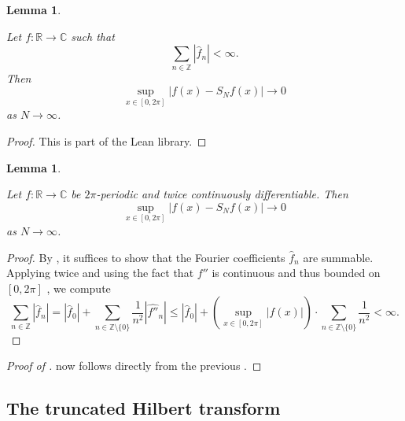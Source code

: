 \documentclass[10pt,a4paper]{article}
\theoremstyle{plain}
\newtheorem{lemma}[theorem]{Lemma}
\theoremstyle{definition}
\numberwithin{equation}{subsection}
\newcommand{\Z}{{\mathbb{Z}}}
\newcommand{\R}{{\mathbb{R}}}
\newcommand{\lean}[1]{}
\newcommand{\proves}[1]{}
\newcommand{\uses}[1]{}
\newcommand{\leanok}{}
\def\C{\mathbb{C}}
\begin{document}
\begin{lemma}
\label{convergence-of-coeffs-summable}
\leanok
\lean{hasSum_fourier_series_of_summable}
Let $f:\R \to \C$ such that
\begin{equation}
    \sum_{n\in \Z} |\widehat{f}_n| < \infty.
\end{equation}
Then
\begin{equation}
    \sup_{x\in [0,2\pi]} |f(x) - S_Nf(x)| \rightarrow 0
\end{equation}
as $N \rightarrow \infty$.
\end{lemma}

\begin{proof}
\leanok
    This is part of the Lean library.
\end{proof}

\begin{lemma}
\label{convergence-for-twice-contdiff}
\uses{fourier-coeff-derivative,convergence-of-coeffs-summable}
\leanok
\lean{fourierConv_ofTwiceDifferentiable}
    Let $f:\R \to \C$ be $2\pi$-periodic and twice continuously differentiable. Then
    \begin{equation}
        \sup_{x\in [0,2\pi]} |f(x) - S_Nf(x)| \rightarrow 0
    \end{equation}
    as $N \rightarrow \infty$.
\end{lemma}
\begin{proof}
\leanok
By , it suffices to show that the Fourier coefficients $\widehat{f}_n$ are summable.
Applying  twice and using the fact that $f''$ is continuous and thus bounded on $[0,2\pi]$ , we compute
\begin{equation*}
    \sum_{n\in \Z} |\widehat{f}_n| = |\widehat{f}_0| + \sum_{n\in \Z \setminus \{0\}} \frac {1}{n^2} |\widehat{f''}_n|
    \le |\widehat{f}_0| + \left(\sup_{x\in [0,2\pi]} |f(x)| \right) \cdot \sum_{n\in \Z \setminus \{0\}} \frac {1}{n^2}
    < \infty.
\end{equation*}
\end{proof}

\begin{proof}[Proof of ]
\leanok
\proves{convergence-for-smooth}
     now follows directly from the previous .
\end{proof}


\subsection{The truncated Hilbert transform}
\label{10hilbert}
\end{document}
